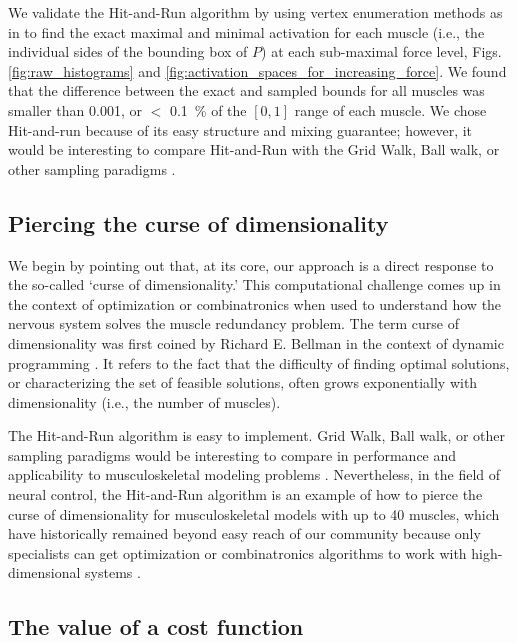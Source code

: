 \documentclass[10pt,letterpaper]{article}
\begin{document}
We validate the Hit-and-Run algorithm by using vertex enumeration methods as in \cite{Valero-Cuevas1998Large,Valero-Cuevas2000Predictive} to find the exact maximal and minimal activation for each muscle (i.e., the individual sides of the bounding box of $P$) at each sub-maximal force level, Figs. \ref{fig:raw_histograms} and \ref{fig:activation_spaces_for_increasing_force}. We found that the difference between the exact and sampled bounds for all muscles was smaller than 0.001, or $<$ 0.1~\% of the $[0, 1]$ range of each muscle. We chose Hit-and-run because of its easy structure and mixing guarantee; however, it would be interesting to compare Hit-and-Run with the Grid Walk, Ball walk, or other sampling paradigms \cite{Vempala}.

\subsection*{Piercing the curse of dimensionality}
We begin by pointing out that, at its core, our approach is a direct response to the so-called `curse of dimensionality.'  This computational challenge comes up in the context of optimization \cite{todorov2002optimal} or combinatronics \cite{valero-cuevas2015fundamentals} when used to understand how the nervous system solves the muscle redundancy problem. The term curse of dimensionality was first coined by Richard E. Bellman  in the context of dynamic programming \cite{bellman1957dynamic}. It refers to the fact that the difficulty of finding optimal  solutions,  or characterizing the set of feasible solutions, often grows exponentially with  dimensionality (i.e., the number of muscles).

The Hit-and-Run algorithm is easy to implement. Grid Walk, Ball walk, or other sampling paradigms would be interesting to compare in performance and applicability to musculoskeletal modeling problems \cite{Vempala}. Nevertheless, in the field of neural control, the Hit-and-Run algorithm is an example of how to pierce the curse of dimensionality for musculoskeletal models with up to 40 muscles, which have historically remained beyond easy reach of our community because only specialists can get optimization or combinatronics algorithms to work with high-dimensional systems \cite{valero-cuevas2009computational,sohn2013cat_bounding_box,Valero-Cuevas2015high-dimensional,todorov2002optimal}.

\subsection*{The value of a cost function}
\end{document}
